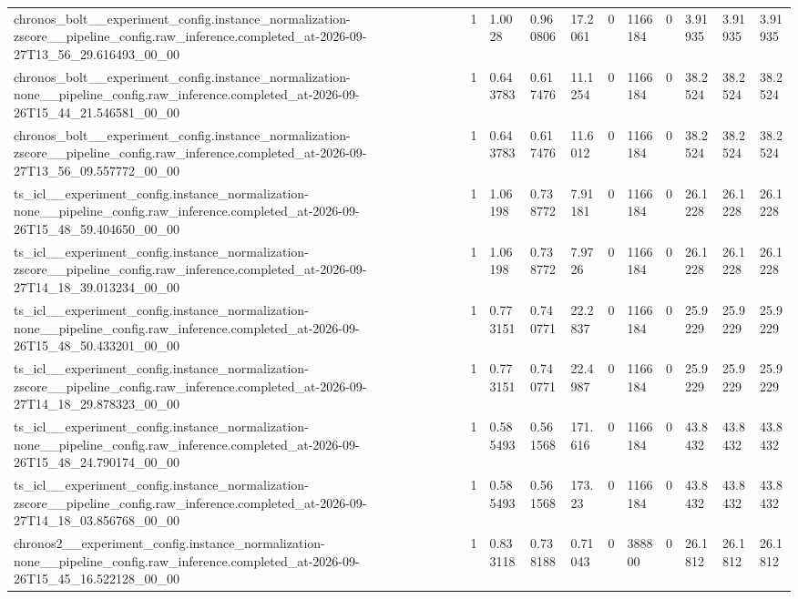 \begin{tabular}{lllllllllll}
chronos\_bolt\_\_experiment\_config.instance\_normalization-zscore\_\_pipeline\_config.raw\_inference.completed\_at-2026-09-27T13\_56\_29.616493\_00\_00 & 1 & 1.0028 & 0.960806 & 17.2061 & 0 & 1166184 & 0 & 3.91935 & 3.91935 & 3.91935 \\
chronos\_bolt\_\_experiment\_config.instance\_normalization-none\_\_pipeline\_config.raw\_inference.completed\_at-2026-09-26T15\_44\_21.546581\_00\_00 & 1 & 0.643783 & 0.617476 & 11.1254 & 0 & 1166184 & 0 & 38.2524 & 38.2524 & 38.2524 \\
chronos\_bolt\_\_experiment\_config.instance\_normalization-zscore\_\_pipeline\_config.raw\_inference.completed\_at-2026-09-27T13\_56\_09.557772\_00\_00 & 1 & 0.643783 & 0.617476 & 11.6012 & 0 & 1166184 & 0 & 38.2524 & 38.2524 & 38.2524 \\
ts\_icl\_\_experiment\_config.instance\_normalization-none\_\_pipeline\_config.raw\_inference.completed\_at-2026-09-26T15\_48\_59.404650\_00\_00 & 1 & 1.06198 & 0.738772 & 7.91181 & 0 & 1166184 & 0 & 26.1228 & 26.1228 & 26.1228 \\
ts\_icl\_\_experiment\_config.instance\_normalization-zscore\_\_pipeline\_config.raw\_inference.completed\_at-2026-09-27T14\_18\_39.013234\_00\_00 & 1 & 1.06198 & 0.738772 & 7.9726 & 0 & 1166184 & 0 & 26.1228 & 26.1228 & 26.1228 \\
ts\_icl\_\_experiment\_config.instance\_normalization-none\_\_pipeline\_config.raw\_inference.completed\_at-2026-09-26T15\_48\_50.433201\_00\_00 & 1 & 0.773151 & 0.740771 & 22.2837 & 0 & 1166184 & 0 & 25.9229 & 25.9229 & 25.9229 \\
ts\_icl\_\_experiment\_config.instance\_normalization-zscore\_\_pipeline\_config.raw\_inference.completed\_at-2026-09-27T14\_18\_29.878323\_00\_00 & 1 & 0.773151 & 0.740771 & 22.4987 & 0 & 1166184 & 0 & 25.9229 & 25.9229 & 25.9229 \\
ts\_icl\_\_experiment\_config.instance\_normalization-none\_\_pipeline\_config.raw\_inference.completed\_at-2026-09-26T15\_48\_24.790174\_00\_00 & 1 & 0.585493 & 0.561568 & 171.616 & 0 & 1166184 & 0 & 43.8432 & 43.8432 & 43.8432 \\
ts\_icl\_\_experiment\_config.instance\_normalization-zscore\_\_pipeline\_config.raw\_inference.completed\_at-2026-09-27T14\_18\_03.856768\_00\_00 & 1 & 0.585493 & 0.561568 & 173.23 & 0 & 1166184 & 0 & 43.8432 & 43.8432 & 43.8432 \\
chronos2\_\_experiment\_config.instance\_normalization-none\_\_pipeline\_config.raw\_inference.completed\_at-2026-09-26T15\_45\_16.522128\_00\_00 & 1 & 0.833118 & 0.738188 & 0.71043 & 0 & 388800 & 0 & 26.1812 & 26.1812 & 26.1812 \\

\end{tabular}
